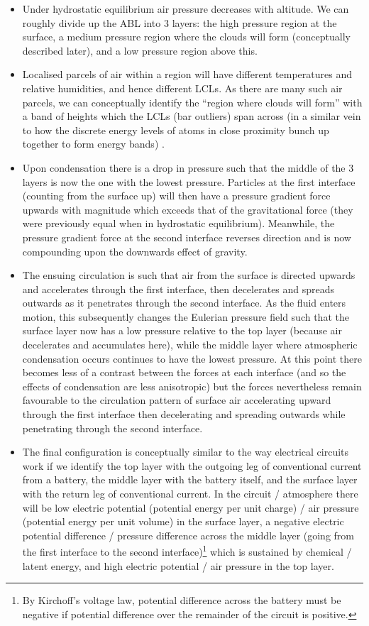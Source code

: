 \begin{itemize}
	\item Under hydrostatic equilibrium air pressure decreases with altitude. We can roughly divide up the ABL into 3 layers: the high pressure region at the surface, a medium pressure region where the clouds will form (conceptually described later), and a low pressure region above this. 
	\item Localised parcels of air within a region will have different temperatures and relative humidities, and hence different LCLs. As there are many such air parcels, we can conceptually identify the “region where clouds will form” with a band of heights which the LCLs (bar outliers) span across (in a similar vein to how the discrete energy levels of atoms in close proximity bunch up together to form energy bands) \citep{green1998}.
	\item Upon condensation there is a drop in pressure such that the middle of the 3 layers is now the one with the lowest pressure. Particles at the first interface (counting from the surface up) will then have a pressure gradient force upwards with magnitude which exceeds that of the gravitational force (they were previously equal when in hydrostatic equilibrium). Meanwhile, the pressure gradient force at the second interface reverses direction and is now compounding upon the downwards effect of gravity. 
	\item The ensuing circulation is such that air from the surface is directed upwards and accelerates through the first interface, then decelerates and spreads outwards as it penetrates through the second interface. As the fluid enters motion, this subsequently changes the Eulerian pressure field such that the surface layer now has a low pressure relative to the top layer (because air decelerates and accumulates here), while the middle layer where atmospheric condensation occurs continues to have the lowest pressure. At this point there becomes less of a contrast between the forces at each interface (and so the effects of condensation are less anisotropic) but the forces nevertheless remain favourable to the circulation pattern of surface air accelerating upward through the first interface then decelerating and spreading outwards while penetrating through the second interface.
	\item The final configuration is conceptually similar to the way electrical circuits work if we identify the top layer with the outgoing leg of conventional current from a battery, the middle layer with the battery itself, and the surface layer with the return leg of conventional current. In the circuit / atmosphere there will be low electric potential (potential energy per unit charge) / air pressure (potential energy per unit volume) in the surface layer, a negative electric potential difference / pressure difference across the middle layer (going from the first interface to the second interface)\footnote{By Kirchoff’s voltage law, potential difference across the battery must be negative if potential difference over the remainder of the circuit is positive.} which is sustained by chemical / latent energy, and high electric potential / air pressure in the top layer.

\end{itemize}
